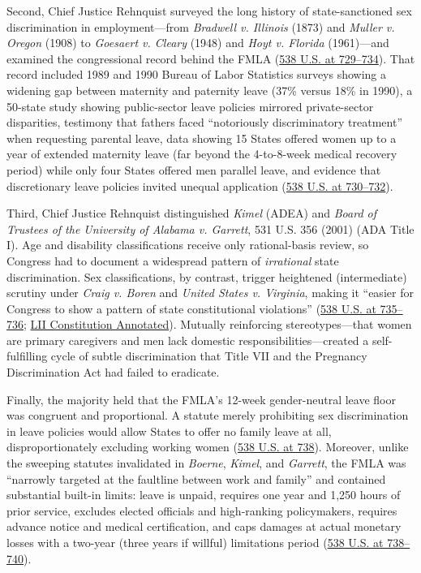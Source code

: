 \documentclass[12pt]{article}
\begin{document}
Second, Chief Justice Rehnquist surveyed the long history of state-sanctioned sex discrimination in employment---from \textit{Bradwell v. Illinois} (1873) and \textit{Muller v. Oregon} (1908) to \textit{Goesaert v. Cleary} (1948) and \textit{Hoyt v. Florida} (1961)---and examined the congressional record behind the FMLA (\href{https://supreme.justia.com/cases/federal/us/538/721/}{538 U.S. at 729--734}). That record included 1989 and 1990 Bureau of Labor Statistics surveys showing a widening gap between maternity and paternity leave (37\% versus 18\% in 1990), a 50-state study showing public-sector leave policies mirrored private-sector disparities, testimony that fathers faced ``notoriously discriminatory treatment'' when requesting parental leave, data showing 15 States offered women up to a year of extended maternity leave (far beyond the 4-to-8-week medical recovery period) while only four States offered men parallel leave, and evidence that discretionary leave policies invited unequal application (\href{https://supreme.justia.com/cases/federal/us/538/721/}{538 U.S. at 730--732}).

Third, Chief Justice Rehnquist distinguished \textit{Kimel} (ADEA) and \textit{Board of Trustees of the University of Alabama v. Garrett}, 531 U.S. 356 (2001) (ADA Title I). Age and disability classifications receive only rational-basis review, so Congress had to document a widespread pattern of \textit{irrational} state discrimination. Sex classifications, by contrast, trigger heightened (intermediate) scrutiny under \textit{Craig v. Boren} and \textit{United States v. Virginia}, making it ``easier for Congress to show a pattern of state constitutional violations'' (\href{https://supreme.justia.com/cases/federal/us/538/721/}{538 U.S. at 735--736}; \href{https://www.law.cornell.edu/constitution-conan/amendment-14/section-5/modern-doctrine}{LII Constitution Annotated}). Mutually reinforcing stereotypes---that women are primary caregivers and men lack domestic responsibilities---created a self-fulfilling cycle of subtle discrimination that Title VII and the Pregnancy Discrimination Act had failed to eradicate.

Finally, the majority held that the FMLA's 12-week gender-neutral leave floor was congruent and proportional. A statute merely prohibiting sex discrimination in leave policies would allow States to offer no family leave at all, disproportionately excluding working women (\href{https://supreme.justia.com/cases/federal/us/538/721/}{538 U.S. at 738}). Moreover, unlike the sweeping statutes invalidated in \textit{Boerne}, \textit{Kimel}, and \textit{Garrett}, the FMLA was ``narrowly targeted at the faultline between work and family'' and contained substantial built-in limits: leave is unpaid, requires one year and 1,250 hours of prior service, excludes elected officials and high-ranking policymakers, requires advance notice and medical certification, and caps damages at actual monetary losses with a two-year (three years if willful) limitations period (\href{https://supreme.justia.com/cases/federal/us/538/721/}{538 U.S. at 738--740}).
\end{document}
